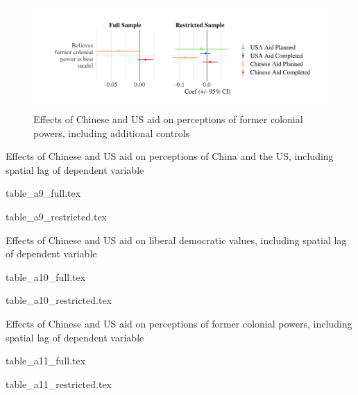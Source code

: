 \documentclass[9pt]{article}
\begin{document}
\begin{figure}[H]
\centering
\caption{Effects of Chinese and US aid on perceptions of former colonial powers, including additional controls}
\includegraphics[width=1\textwidth]{figures/figure_a17.png} %
\end{figure}


\newpage %

\setlength{\tabcolsep}{5pt}
\begin{table}[H]
\caption{Effects of Chinese and US aid on perceptions of China and the US, including spatial lag of dependent variable}
\label{reg}
\centering
{table_a9_full.tex} %
\end{table}

\noindent {}
{table_a9_restricted.tex} %

\newpage %

\setlength{\tabcolsep}{5pt}
\begin{table}[H]
\caption{Effects of Chinese and US aid on liberal democratic values, including spatial lag of dependent variable}
\label{reg}
\centering
{table_a10_full.tex} %
\end{table}

\noindent {}
{table_a10_restricted.tex} %


\newpage %

\setlength{\tabcolsep}{5pt}
\begin{table}[H]
\caption{Effects of Chinese and US aid on perceptions of former colonial powers, including spatial lag of dependent variable}
\label{reg}
\centering
{table_a11_full.tex} %
\end{table}

\noindent {}
{table_a11_restricted.tex} %
\end{document}
